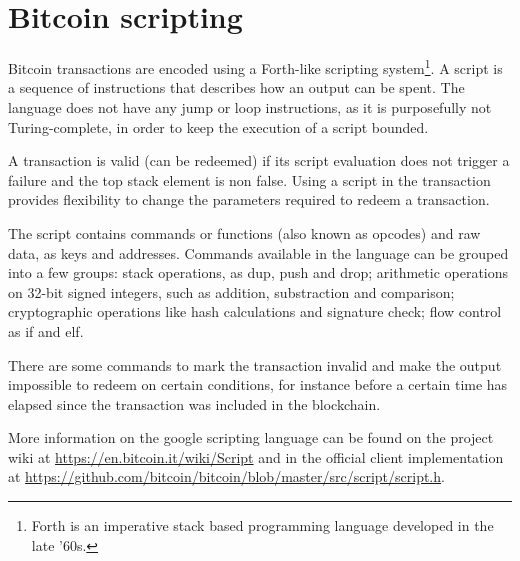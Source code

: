 \section{Bitcoin scripting} \label{sec:appendix_script}

Bitcoin transactions are encoded using a Forth-like scripting
 system\footnote{Forth is an imperative stack based programming language
                 developed in the late '60s.}.
A script is a sequence of instructions that describes how an output can be
  spent.
The language does not have any jump or loop instructions, as it is purposefully
  not Turing-complete, in order to keep the execution of a script bounded.

A transaction is valid (can be redeemed) if its script evaluation does not
  trigger a failure and the top stack element is non false.
Using a script in the transaction provides flexibility to change the
  parameters required to redeem a transaction.

The script contains commands or functions (also known as opcodes) and raw data,
  as keys and addresses.
Commands available in the language can be grouped into a few groups:
  stack operations, as dup, push and drop;
  arithmetic operations on 32-bit signed integers, such as addition,
    substraction and comparison;
  cryptographic operations like hash calculations and signature check;
  flow control as if and elf.

There are some commands to mark the transaction invalid and make the
  output impossible to redeem on certain conditions, for instance before a
  certain time has elapsed since the transaction was included in the
  blockchain.

More information on the google scripting language can be found on the project
  wiki at \url{https://en.bitcoin.it/wiki/Script} and in the official client
  implementation at
  \url{https://github.com/bitcoin/bitcoin/blob/master/src/script/script.h}.



